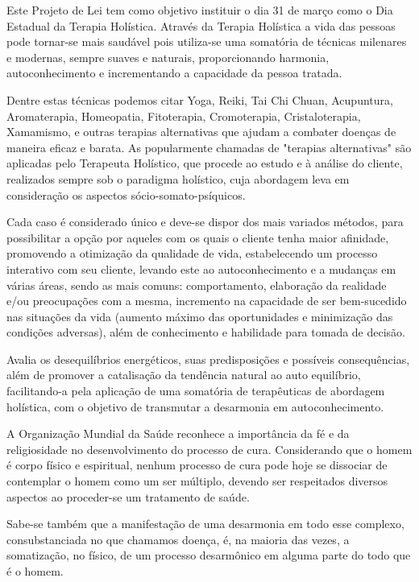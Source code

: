 \documentclass[10pt]{article}
\begin{document}
  Este Projeto de Lei tem como objetivo instituir o dia 31 de março como o Dia Estadual da Terapia Holística.  Através da Terapia Holística a vida das pessoas pode tornar-se mais saudável pois utiliza-se uma somatória de técnicas milenares e modernas, sempre suaves e naturais, proporcionando harmonia, autoconhecimento e incrementando a capacidade da pessoa tratada. 

Dentre estas técnicas podemos citar Yoga, Reiki, Tai Chi Chuan, Acupuntura, Aromaterapia, Homeopatia, Fitoterapia, Cromoterapia, Cristaloterapia, Xamamismo, e outras terapias alternativas que ajudam a combater doenças de maneira eficaz e barata. As popularmente chamadas de "terapias alternativas" são aplicadas pelo Terapeuta Holístico, que procede ao estudo e à análise do cliente, realizados sempre sob o paradigma holístico, cuja abordagem leva em consideração os aspectos sócio-somato-psíquicos.

Cada caso é considerado único e deve-se dispor dos mais variados métodos, para possibilitar a opção por aqueles com os quais o cliente tenha maior afinidade, promovendo a otimização da qualidade de vida, estabelecendo um processo interativo com seu cliente, levando este ao autoconhecimento e a mudanças em várias áreas, sendo as mais comuns: comportamento, elaboração da realidade e/ou preocupações com a mesma, incremento na capacidade de ser bem-sucedido nas situações da vida (aumento máximo das oportunidades e minimização das condições adversas), além de conhecimento e habilidade para tomada de decisão. 

Avalia os desequilíbrios energéticos, suas predisposições e possíveis consequências, além de promover a catalisação da tendência natural ao auto equilíbrio, facilitando-a pela aplicação de uma somatória de terapêuticas de abordagem holística, com o objetivo de transmutar a desarmonia em autoconhecimento.

A Organização Mundial da Saúde reconhece a importância da fé e da religiosidade no desenvolvimento do processo de cura. Considerando que o homem é corpo físico e espiritual, nenhum processo de cura pode hoje se dissociar de contemplar o homem como um ser múltiplo, devendo ser respeitados diversos aspectos ao proceder-se um tratamento de saúde.

Sabe-se também que a manifestação de uma desarmonia em todo esse complexo, consubstanciada no que chamamos doença, é, na maioria das vezes, a somatização, no físico, de um processo desarmônico em alguma parte do todo que é o homem.
\end{document}
